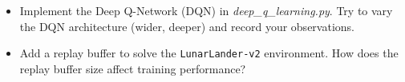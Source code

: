\documentclass{exam}
\begin{document}
\begin{questions}
	\indent
	\begin{itemize}
		\item Implement the Deep Q-Network (DQN) in \emph{deep\_q\_learning.py}. Try to vary the DQN architecture (wider, deeper) and record your observations.
		\item Add a replay buffer to solve the \texttt{LunarLander-v2} environment.
		 How does the replay buffer size affect training performance?
	\end{itemize}
	
\end{questions}
\end{document}
